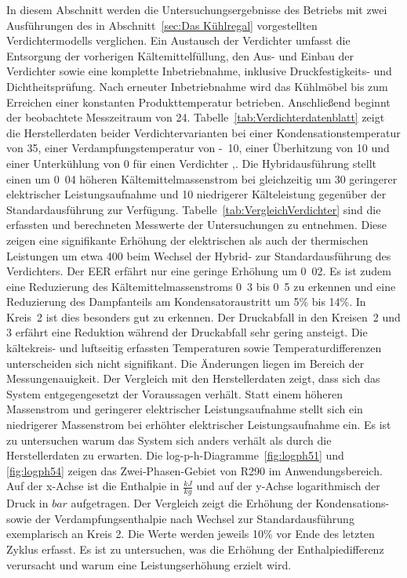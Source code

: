 In diesem Abschnitt werden die Untersuchungsergebnisse des Betriebs mit zwei Ausführungen des in Abschnitt~\ref{sec:Das Kühlregal} vorgestellten Verdichtermodells verglichen. 
Ein Austausch der Verdichter umfasst die Entsorgung der vorherigen Kältemittelfüllung, den Aus- und Einbau der Verdichter sowie eine komplette Inbetriebnahme, inklusive Druckfestigkeits- und Dichtheitsprüfung. Nach erneuter Inbetriebnahme wird das Kühlmöbel bis zum Erreichen einer konstanten Produkttemperatur betrieben. Anschließend beginnt der beobachtete Messzeitraum von \unit{24}{\hour}. \newline
Tabelle~\ref{tab:Verdichterdatenblatt} zeigt die Herstellerdaten beider Verdichtervarianten bei einer Kondensationstemperatur von \unit{35}{\celsius}, einer Verdampfungstemperatur von \unit{-10}{\celsius}, einer Überhitzung von \unit{10}{\kelvin} und einer Unterkühlung von \unit{0}{\kelvin} für einen Verdichter \cite{EmersonClimateTechnologies.},\cite{EmersonClimateTechnologies.2018}. Die Hybridausführung stellt einen um \unit{0.04}{\gram\per\second} höheren Kältemittelmassenstrom bei gleichzeitig um \unit{30}{\watt} geringerer elektrischer Leistungsaufnahme und \unit{10}{\watt} niedrigerer Kälteleistung gegenüber der Standardausführung zur Verfügung.  \newline
Tabelle~\ref{tab:VergleichVerdichter} sind die erfassten und berechneten Messwerte der Untersuchungen zu entnehmen. Diese zeigen eine signifikante Erhöhung der elektrischen als auch der thermischen Leistungen um etwa \unit{400}{\watt} beim Wechsel der Hybrid- zur Standardausführung des Verdichters. Der EER erfährt nur eine geringe Erhöhung um \unit{0.02}{}. Es ist zudem eine Reduzierung des Kältemittelmassenstroms \unit{0.3}{\gram\per\second} bis \unit{0.5}{\gram\per\second} zu erkennen und eine Reduzierung des Dampfanteils am Kondensatoraustritt um \unit{5}{\%} bis \unit{14}{\%}. In Kreis~2 ist dies besonders gut zu erkennen. Der Druckabfall in den Kreisen~2 und 3 erfährt eine Reduktion während der Druckabfall sehr gering ansteigt. Die kältekreis- und luftseitig erfassten Temperaturen sowie Temperaturdifferenzen unterscheiden sich nicht signifikant. Die Änderungen liegen im Bereich der Messungenauigkeit. Der Vergleich mit den Herstellerdaten zeigt, dass sich das System entgegengesetzt der Voraussagen verhält. Statt einem höheren Massenstrom und geringerer elektrischer Leistungsaufnahme stellt sich ein niedrigerer Massenstrom bei erhöhter elektrischer Leistungsaufnahme ein. Es ist zu untersuchen warum das System sich anders verhält als durch die Herstellerdaten zu erwarten.\newline
Die log-p-h-Diagramme~\ref{fig:logph51} und \ref{fig:logph54} zeigen das Zwei-Phasen-Gebiet von R290 im Anwendungsbereich. Auf der x-Achse ist die Enthalpie in $\frac{kJ}{kg}$ und auf der y-Achse logarithmisch der Druck in $bar$ aufgetragen. Der Vergleich zeigt die Erhöhung der Kondensations- sowie der Verdampfungsenthalpie nach Wechsel zur Standardausführung exemplarisch an Kreis 2. Die Werte werden jeweils \unit{10}{\%} vor Ende des letzten Zyklus erfasst. Es ist zu untersuchen, was die Erhöhung der Enthalpiedifferenz verursacht und warum eine Leistungserhöhung erzielt wird.

